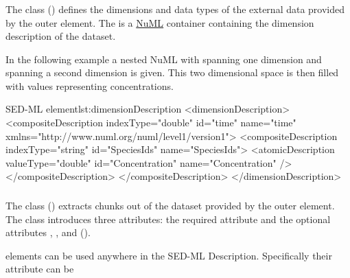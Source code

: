 \subsubsection{}
\label{class:dimensionDescription}
The  class () defines the dimensions and data types of the external data provided by the outer \SedDataDescription element. The  is a \hyperref[sec:numl]{NuML} container containing the dimension description of the dataset.

In the following example a nested NuML  with  spanning one dimension and  spanning a second dimension is given. This two dimensional space is then filled with  values representing concentrations.

\begin{myXmlLst}{SED-ML  element}{lst:dimensionDescription}
<dimensionDescription>
	<compositeDescription indexType="double" id="time" name="time" 
		xmlns="http://www.numl.org/numl/level1/version1">
		<compositeDescription indexType="string" id="SpeciesIds" name="SpeciesIds">
			<atomicDescription valueType="double" id="Concentration" name="Concentration" />
		</compositeDescription>
	</compositeDescription>
</dimensionDescription>
\end{myXmlLst} 

\subsubsection{}
\label{class:dataSource}
The  class () extracts chunks out of the dataset provided by the outer \SedDataDescription element. The  class introduces three attributes: the required attribute \hyperref[sec:id]{} and the optional attributes \hyperref[sec:name]{}, \hyperref[sec:indexSet]{}, and \hyperref[class:listOfSlices]{} ().

\SedDataSource elements can be used anywhere in the SED-ML Description. Specifically their \hyperref[type:id]{} attribute can be 

